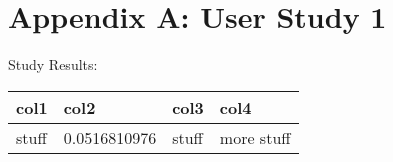 


\section*{Appendix A: User Study 1}


Study Results:

\begin{table}[h!]
\centering
 \begin{tabular}{|m{5em} || m{6em} | m{10em} | m{10em}|} 
 \hline
 col1 & col2 & col3 & col4 \\ 
 \hline\hline
 stuff & 0.0516810976 & stuff & more stuff \\ 
 [1ex] 
 \hline
 \end{tabular}
\end{table}




